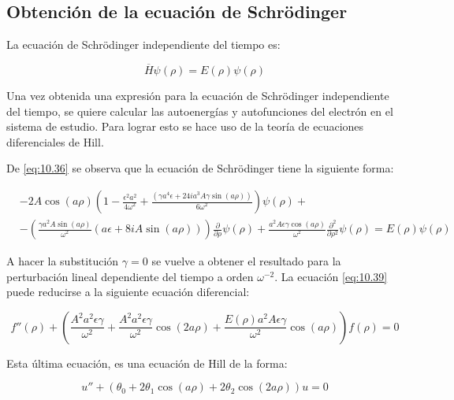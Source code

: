 \subsection{Obtención de la ecuación de Schrödinger}

La ecuación de Schrödinger independiente del tiempo es: 

\begin{equation}\label{eq:10.38}
    \overline{H}\psi(\rho)=E(\rho)\psi(\rho)
\end{equation}

Una vez obtenida una expresión para la ecuación de Schrödinger independiente del tiempo, se quiere calcular las autoenergías y autofunciones del electrón en el sistema de estudio. Para lograr esto se hace uso de la teoría de ecuaciones diferenciales de Hill.

De \ref{eq:10.36} se observa que la ecuación de Schrödinger tiene la siguiente forma:

\begin{equation}\label{eq:10.39}
\begin{split}
     &-2A\cos (a \rho)\left(1-\frac{ \epsilon^2a^2 }{4 \omega^2}+\frac{\left(\gamma a^4
   \epsilon+24 i a^3 A\gamma \sin (a \rho)\right)}{6 \omega^2} \right)\psi(\rho)+\\&
   -\left(\frac{\gamma a^2A \sin (a \rho)}{\omega^2}\left(a \epsilon+8 i A \sin (a \rho)\right)\right)\frac{\partial}{\partial \rho}\psi(\rho)+\frac{a^2 A \epsilon \gamma \cos (a \rho)}{\omega^2}\frac{\partial^2}{\partial \rho^2}\psi(\rho)=E(\rho)\psi(\rho)
   \end{split}
\end{equation}

A hacer la substitución $\gamma=0$ se vuelve a obtener el resultado para la perturbación lineal dependiente del tiempo a orden $\omega^{-2}$. La ecuación \ref{eq:10.39} puede reducirse a la siguiente ecuación diferencial: 

\begin{equation}\label{eq:10.40}
    f''(\rho)+\left(\frac{A^2a^2\epsilon\gamma}{\omega^2}+\frac{A^2a^2\epsilon\gamma}{\omega^2}\cos(2a\rho)+\frac{E(\rho)a^2A\epsilon\gamma}{\omega^2}\cos(a\rho)\right) f(\rho)=0
\end{equation}


Esta última ecuación, es una ecuación de Hill de la forma:

\begin{equation}\label{eq:10.41}
    u''+(\theta_0+2\theta_1\cos(a\rho)+2\theta_2\cos(2a\rho))u=0
\end{equation}

